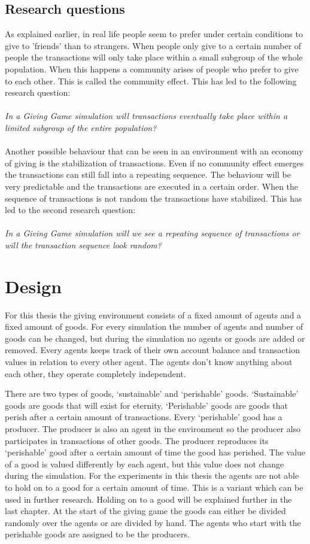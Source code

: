 \documentclass[twoside,openright]{uva-bachelor-thesis}
\begin{document}
\clearpage
\section{Research questions}
As explained earlier, in real life people seem to prefer under certain conditions to give to 'friends' than to strangers. When people only give to a certain number of people the transactions will only take place within a small subgroup of the whole population. When this happens a community arises of people who prefer to give to each other. This is called the community effect. This has led to the following research question:
\\
\\
\textit{In a Giving Game simulation will transactions eventually take place within a limited subgroup of the entire population?}
\\
\\
Another possible behaviour that can be seen in an environment with an economy of giving is the stabilization of transactions. Even if no community effect emerges the transactions can still fall into a repeating sequence. The behaviour will be very predictable and the transactions are executed in a certain order. When the sequence of transactions is not random the transactions have stabilized. This has led to the second research question:
\\
\\
\textit{In a Giving Game simulation will we see a repeating sequence of transactions or will the transaction sequence look random?}


\chapter{Design}
For this thesis the giving environment consists of a fixed amount of agents and a fixed amount of goods. For every simulation the number of agents and number of goods can be changed, but during the simulation no agents or goods are added or removed.  Every agents keeps track of their own account balance and transaction values in relation to every other agent. The agents don’t know anything about each other, they operate completely independent.

There are two types of goods, ‘sustainable’ and ‘perishable’ goods. ‘Sustainable’ goods are goods that will exist for eternity. ‘Perishable’ goods are goods that perish after a certain amount of transactions. Every ‘perishable’ good has a producer. The producer is also an agent in the environment so the producer also participates in transactions of other goods. The producer reproduces its ‘perishable’ good after a certain amount of time the good has perished. The value of a good is valued differently by each agent, but this value does not change during the simulation. For the experiments in this thesis the agents are not able to hold on to a good for a certain amount of time. This is a variant which can be used in further research. Holding on to a good will be explained further in the last chapter. At the start of the giving game the goods can either be divided randomly over the agents or are divided by hand. The agents who start with the perishable goods are assigned to be the producers.
\end{document}
